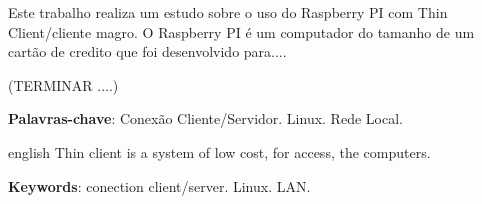 \documentclass[
	12pt,				%
	openright,			%
	twoside,			%
	a4paper,			%
	chapter=TITLE,		%
	english,			%
	brazil				%
	]{abntex2}
\begin{document}




\setlength{\absparsep}{18pt} %
\begin{resumo}
Este trabalho realiza um estudo sobre o uso do Raspberry PI com Thin Client/cliente magro. O Raspberry PI é um computador do tamanho de um cartão de credito que foi desenvolvido para....

(TERMINAR ....)


 \textbf{Palavras-chave}: Conexão Cliente/Servidor. Linux. Rede Local.	%
\end{resumo}

\begin{resumo}[Abstract]
 \begin{otherlanguage*}{english}
   Thin client is a system of low cost, for access, the computers.

   \vspace{\onelineskip}
 
   \noindent 
   \textbf{Keywords}: conection client/server. Linux. LAN.
 \end{otherlanguage*}
\end{resumo}





\tableofcontents*
\cleardoublepage

\end{document}
